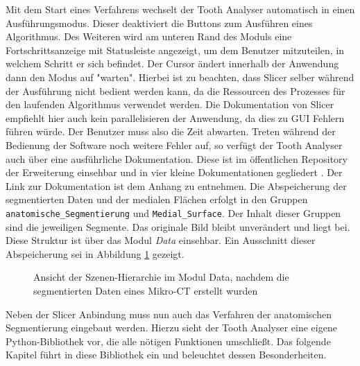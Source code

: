 Mit dem Start eines Verfahrens wechselt der Tooth Analyser automatisch in einen
Ausführungsmodus. Dieser deaktiviert die Buttons zum Ausführen eines Algorithmus.
Des Weiteren wird am unteren Rand des Moduls eine Fortschrittsanzeige mit
Statusleiste angezeigt, um dem Benutzer mitzuteilen, in welchem Schritt er sich
befindet. Der Cursor ändert innerhalb der Anwendung dann den Modus auf "warten".
Hierbei ist zu beachten, dass Slicer selber während der Ausführung nicht bedient
werden kann, da die Ressourcen des Prozesses für den laufenden Algorithmus
verwendet werden. Die Dokumentation von Slicer empfiehlt hier auch kein parallelisieren
der Anwendung, da dies zu \ac{GUI} Fehlern führen würde. Der Benutzer muss also
die Zeit abwarten. Treten während der Bedienung der Software noch weitere Fehler
auf, so verfügt der Tooth Analyser auch über eine ausführliche Dokumentation. Diese
ist im öffentlichen Repository der Erweiterung einsehbar und in vier kleine Dokumentationen
gegliedert \citep[vgl.][]{procida2017}. Der Link zur Dokumentation ist dem Anhang
zu entnehmen. Die Abspeicherung der segmentierten Daten und der medialen Flächen
erfolgt in den Gruppen \texttt{anatomische\_Segmentierung} und \texttt{Medial\_Surface}.
Der Inhalt dieser Gruppen sind die jeweiligen Segmente. Das originale Bild
bleibt unverändert und liegt bei. Diese Struktur ist über das Modul \textit{Data}
einsehbar. Ein Ausschnitt dieser Abspeicherung sei in Abbildung \ref{fig:data_module}
gezeigt.

\pagebreak

\begin{figure}[h]
	\centering
	\caption{Ansicht der Szenen-Hierarchie im Modul Data, nachdem die segmentierten
	Daten eines Mikro-CT erstellt wurden}
	\label{fig:data_module}
\end{figure}

Neben der Slicer Anbindung muss nun auch das Verfahren der anatomischen Segmentierung
eingebaut werden. Hierzu sieht der Tooth Analyser eine eigene Python-Bibliothek
vor, die alle nötigen Funktionen umschließt. Das folgende Kapitel führt in diese
Bibliothek ein und beleuchtet dessen Besonderheiten.

